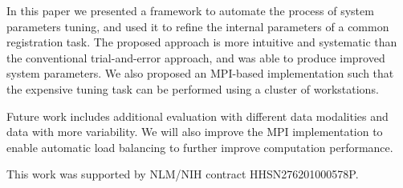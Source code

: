 \documentclass[]{spie}  %
\begin{document}
In this paper we presented a framework to automate the process of system parameters tuning, and used it to refine the internal parameters of a common registration task. The proposed approach is more intuitive and systematic than the conventional trial-and-error approach, and was able to produce improved system parameters. We also proposed an MPI-based implementation such that the expensive tuning task can be performed using a cluster of workstations.

Future work includes additional evaluation with different data modalities and data with more variability. We will also improve the MPI implementation to enable automatic load balancing to further improve computation performance.

\acknowledgments     %

This work was supported by NLM/NIH contract HHSN276201000578P.


\end{document}

